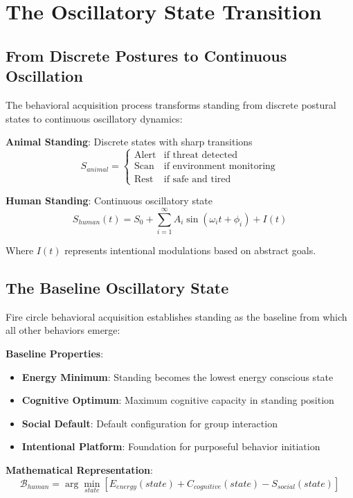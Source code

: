 \documentclass[12pt]{article}
\begin{document}
\section{The Oscillatory State Transition}

\subsection{From Discrete Postures to Continuous Oscillation}

The behavioral acquisition process transforms standing from discrete postural states to continuous oscillatory dynamics:

\textbf{Animal Standing}: Discrete states with sharp transitions
$$S_{animal} = \begin{cases}
\text{Alert} & \text{if threat detected} \\
\text{Scan} & \text{if environment monitoring} \\
\text{Rest} & \text{if safe and tired}
\end{cases}$$

\textbf{Human Standing}: Continuous oscillatory state
$$S_{human}(t) = S_0 + \sum_{i=1}^{\infty} A_i \sin(\omega_i t + \phi_i) + I(t)$$

Where $I(t)$ represents intentional modulations based on abstract goals.

\subsection{The Baseline Oscillatory State}

Fire circle behavioral acquisition establishes standing as the baseline from which all other behaviors emerge:

\textbf{Baseline Properties}:
\begin{itemize}
\item \textbf{Energy Minimum}: Standing becomes the lowest energy conscious state
\item \textbf{Cognitive Optimum}: Maximum cognitive capacity in standing position
\item \textbf{Social Default}: Default configuration for group interaction
\item \textbf{Intentional Platform}: Foundation for purposeful behavior initiation
\end{itemize}

\textbf{Mathematical Representation}:
$$\mathcal{B}_{human} = \arg\min_{state} [E_{energy}(state) + C_{cognitive}(state) - S_{social}(state)]$$
\end{document}
